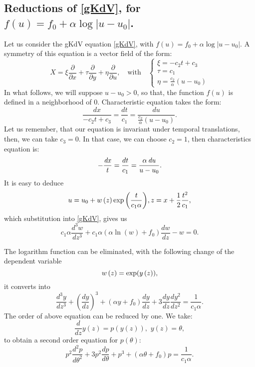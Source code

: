 \documentclass[
11pt,%
tightenlines,%
twoside,%
onecolumn,%
nofloats,%
nobibnotes,%
nofootinbib,%
superscriptaddress,%
noshowpacs,%
centertags]%
{revtex4}
\begin{document}
\subsection{Reductions of \eqref{gKdV}, for  $ f(u)=f_0 + \alpha \log|u-u_0|$.}

Let us consider the gKdV equation \eqref{gKdV}, with $f(u) = f_0 + \alpha \log|u-u_0|$. A symmetry of this equation is a vector field of the form:
 \begin{equation}
X = \xi \frac{\partial}{\partial x} + \tau   \frac{\partial}{\partial y} + \eta  \frac{\partial}{\partial u}, \quad \mbox{with}\quad 
\begin{cases}
\xi =-c_2 t+c_3 \\
\tau = c_1 \\
\eta =\frac{c_2}{\alpha} (u-u_0)
\end{cases}
\end{equation}
In what follows, we will suppose $u-u_0>0$, so that, the function $f(u)$ is defined in a neighborhood of $0$. 
Characteristic equation takes the form:
\begin{equation}\label{car3}
\frac{dx}{-c_2 t+c_3}=\frac{dt}{c_1}=\frac{du}{\frac{c_2}{\alpha} (u-u_0)}.
\end{equation}
Let us remember, that our equation is invariant under temporal translations, then, we can take $c_3 =0$. In that case, we can choose $c_2 =1$, then characteristics equation is:
\begin{equation}
-{\frac{{\it dx}}{t}}=\frac{dt}{c_1}={\frac{\alpha\,{\it du}}{u-u_{0}}}.
\end{equation}
It is easy to deduce
\begin{equation}
u=u_{0}+w\left(z\right){{\rm exp}\left(\frac{t}{c_{1}\alpha}\right)},z=x+\frac{1}{2}{\frac{{t}^{2}}{c_{1}}},
\end{equation}
which substitution into  \eqref{gKdV}, gives us
\begin{equation}
c_1\alpha\frac{d^3w}{dz^3} + c_1 \alpha(\alpha\ln(w)+f_0)\frac{dw}{dz} - w = 0.
\end{equation}

The logarithm function can be eliminated, with the following change of the dependent variable 
 \begin{equation}
 w\left(z\right)={{\rm exp}({y\left(z\right)})},
    \end{equation}
it converts into
\begin{equation}
 \frac{d^3y}{dz^3}  + \left(\frac{dy}{dz}\right)^3 + (\alpha y + f_0) \frac{dy}{dz}
 + 3\frac{dy}{dz} \frac{dy^2}{dz^2}
 = \frac{1}{c_1\alpha}.
\end{equation}
The order of above equation can be reduced by one. We take:
\begin{equation}
\frac{d}{dz}y(z) =p\left(y\left(z\right)\right),\,\, y\left(z\right)=\theta,
 \end{equation}
to obtain a second order equation for $p(\theta)$:
\begin{equation}
  p^2\frac{d^2p}{d\theta^2} + 3p^2\frac{dp}{d\theta} +
  p^3 + (\alpha \theta + f_0)p   = \frac{1}{c_1\alpha}.
\end{equation}
 
\end{document}
